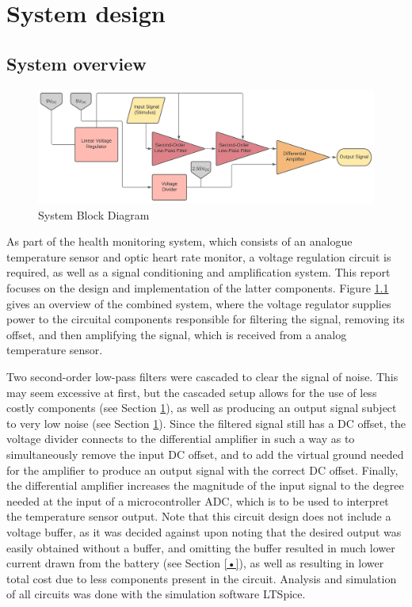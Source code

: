 
\chapter{System design}
	\section{System overview} \label{sec:system}

\begin{figure}[h]
    \centering
    \includegraphics[width = 1\textwidth]{Figures/1.1_block}
    \caption{System Block Diagram}
    \label{fig:1.1_block}
\end{figure}

As part of the health monitoring system, which consists of an analogue temperature sensor and optic heart rate monitor, a voltage regulation circuit is required, as well as a signal conditioning and amplification system. This report focuses on the design and implementation of the latter components. Figure \ref{fig:1.1_block} gives an overview of the combined system, where the voltage regulator supplies power to the circuital components responsible for filtering the signal, removing its offset, and then amplifying the signal, which is received from a analog temperature sensor.

Two second-order low-pass filters were cascaded to clear the signal of noise. This may seem excessive at first, but the cascaded setup allows for the use of less costly components (see Section \ref{}), as well as producing an output signal subject to very low noise (see Section \ref{}). Since the filtered signal still has a DC offset, the voltage divider connects to the differential amplifier in such a way as to simultaneously remove the input DC offset, and to add the virtual ground needed for the amplifier to produce an output signal with the correct DC offset. Finally, the differential amplifier increases the magnitude of the input signal to the degree needed at the input of a microcontroller ADC, which is to be used to interpret the temperature sensor output. Note that this circuit design does not include a voltage buffer, as it was decided against upon noting that the desired output was easily obtained without a buffer, and omitting the buffer resulted in much lower current drawn from the battery (see Section \ref{•}), as well as resulting in lower total cost due to less components present in the circuit. Analysis and simulation of all circuits was done with the simulation software LTSpice.

\vfill









